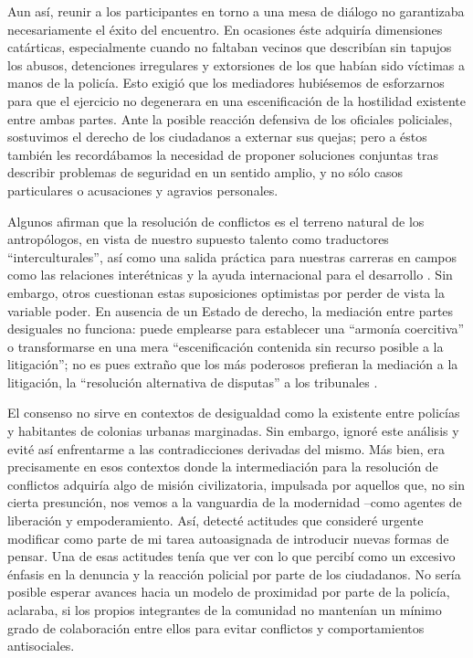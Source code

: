 \documentclass[
  spanish,
  11pt,
  a4paper,
]{scrbook}
\begin{document}
Aun así, reunir a los participantes en torno a una mesa de diálogo no
garantizaba necesariamente el éxito del encuentro. En ocasiones éste
adquiría dimensiones catárticas, especialmente cuando no faltaban
vecinos que describían sin tapujos los abusos, detenciones irregulares y
extorsiones de los que habían sido víctimas a manos de la policía. Esto
exigió que los mediadores hubiésemos de esforzarnos para que el
ejercicio no degenerara en una escenificación de la hostilidad existente
entre ambas partes. Ante la posible reacción defensiva de los oficiales
policiales, sostuvimos el derecho de los ciudadanos a externar sus
quejas; pero a éstos también les recordábamos la necesidad de proponer
soluciones conjuntas tras describir problemas de seguridad en un sentido
amplio, y no sólo casos particulares o acusaciones y agravios
personales.

Algunos afirman que la resolución de conflictos es el terreno natural de
los antropólogos, en vista de nuestro supuesto talento como traductores
``interculturales'', así como una salida práctica para nuestras carreras
en campos como las relaciones interétnicas y la ayuda internacional para
el desarrollo \autocite[1-2]{Benthall2012}. Sin embargo, otros
cuestionan estas suposiciones optimistas por perder de vista la variable
poder. En ausencia de un Estado de derecho, la mediación entre partes
desiguales no funciona: puede emplearse para establecer una ``armonía
coercitiva'' o transformarse en una mera ``escenificación contenida sin
recurso posible a la litigación''; no es pues extraño que los más
poderosos prefieran la mediación a la litigación, la ``resolución
alternativa de disputas'' a los tribunales \autocite[26]{Nader2012}.

El consenso no sirve en contextos de desigualdad como la existente entre
policías y habitantes de colonias urbanas marginadas. Sin embargo,
ignoré este análisis y evité así enfrentarme a las contradicciones
derivadas del mismo. Más bien, era precisamente en esos contextos donde
la intermediación para la resolución de conflictos adquiría algo de
misión civilizatoria, impulsada por aquellos que, no sin cierta
presunción, nos vemos a la vanguardia de la modernidad --como agentes de
liberación y empoderamiento. Así, detecté actitudes que consideré
urgente modificar como parte de mi tarea autoasignada de introducir
nuevas formas de pensar. Una de esas actitudes tenía que ver con lo que
percibí como un excesivo énfasis en la denuncia y la reacción policial
por parte de los ciudadanos. No sería posible esperar avances hacia un
modelo de proximidad por parte de la policía, aclaraba, si los propios
integrantes de la comunidad no mantenían un mínimo grado de colaboración
entre ellos para evitar conflictos y comportamientos antisociales.
\end{document}
